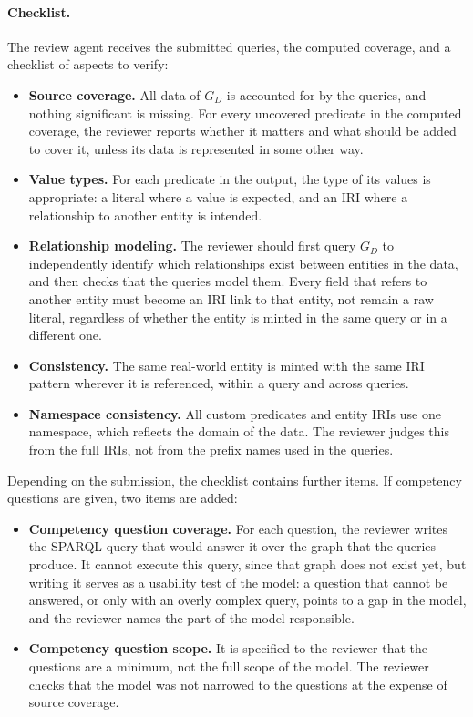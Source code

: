 \paragraph{Checklist.}
The review agent receives the submitted queries, the computed coverage, and a checklist of aspects to verify:
\begin{itemize}[leftmargin=*, itemsep=3pt]
  \item \textbf{Source coverage.} All data of \(G_D\) is accounted for by the queries, and nothing significant is missing. For every uncovered predicate in the computed coverage, the reviewer reports whether it matters and what should be added to cover it, unless its data is represented in some other way.
  \item \textbf{Value types.} For each predicate in the output, the type of its values is appropriate: a literal where a value is expected, and an IRI where a relationship to another entity is intended.
  \item \textbf{Relationship modeling.} The reviewer should first query \(G_D\) to independently identify which relationships exist between entities in the data, and then checks that the queries model them. Every field that refers to another entity must become an IRI link to that entity, not remain a raw literal, regardless of whether the entity is minted in the same query or in a different one.
  \item \textbf{Consistency.} The same real-world entity is minted with the same IRI pattern wherever it is referenced, within a query and across queries.
  \item \textbf{Namespace consistency.} All custom predicates and entity IRIs use one namespace, which reflects the domain of the data. The reviewer judges this from the full IRIs, not from the prefix names used in the queries.
\end{itemize}
Depending on the submission, the checklist contains further items. If competency questions are given, two items are added:
\begin{itemize}[leftmargin=*, itemsep=3pt]
  \item \textbf{Competency question coverage.} For each question, the reviewer writes the SPARQL query that would answer it over the graph that the queries produce. It cannot execute this query, since that graph does not exist yet, but writing it serves as a usability test of the model: a question that cannot be answered, or only with an overly complex query, points to a gap in the model, and the reviewer names the part of the model responsible.
  \item \textbf{Competency question scope.} It is specified to the reviewer that the questions are a minimum, not the full scope of the model. The reviewer checks that the model was not narrowed to the questions at the expense of source coverage.
\end{itemize}

